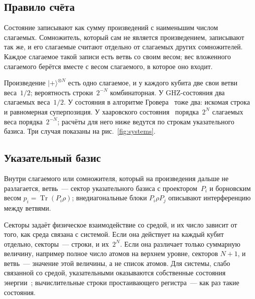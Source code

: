 \documentclass[11pt,a4paper]{article}
\DeclareMathOperator{\Tr}{Tr}
\begin{document}
\subsection{Правило счёта}
\label{sec:counting}

Состояние записывают как сумму произведений с наименьшим числом слагаемых. Сомножитель, который сам не является произведением, записывают так же, и его слагаемые считают отдельно от слагаемых других сомножителей. Каждое слагаемое такой записи есть ветвь со своим весом; вес вложенного слагаемого берётся вместе с весом слагаемого, в которое оно входит.

Произведение $|+\rangle^{\otimes N}$ есть одно слагаемое, и у каждого кубита две свои ветви веса~$1/2$; вероятность строки~$2^{-N}$ комбинаторная. У GHZ-состояния два слагаемых веса~$1/2$. У состояния в алгоритме Гровера~\cite{grover1996} тоже два: искомая строка и равномерная суперпозиция. У хааровского состояния~\cite{page1993} порядка~$2^N$ слагаемых веса порядка~$2^{-N}$; расчёты для него ниже ведутся по строкам указательного базиса. Три случая показаны на рис.~\ref{fig:systems}.

\begin{center}
\begin{minipage}{\linewidth}\centering

\label{fig:systems}
\end{minipage}
\end{center}

\subsection{Указательный базис}
\label{sec:pointer}

Внутри слагаемого или сомножителя, который на произведения дальше не разлагается, ветвь~--- сектор указательного базиса с проектором~$P_i$ и борновским весом $p_i=\Tr(P_i\rho)$; внедиагональные блоки $P_i\rho P_j$ описывают интерференцию между ветвями.

Секторы задаёт физическое взаимодействие со средой, и их число зависит от того, как среда связана с системой. Если она действует на каждый кубит отдельно, секторы~--- строки, и их~$2^N$. Если она различает только суммарную величину, например полное число атомов на верхнем уровне, секторов $N+1$, и ветвь~--- значение этой величины, а не список атомов. Для системы, слабо связанной со средой, указательными оказываются собственные состояния энергии~\cite{pazzurek1999}; вычислительные строки простаивающего регистра~--- как раз такие состояния.
\end{document}
